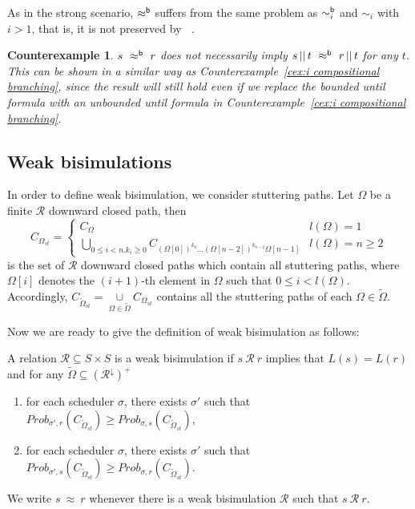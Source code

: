 \documentclass{LMCS}
\DeclareMathOperator{\interleave}{||}
\newtheorem{counter}{Counterexample}
\def\tilde{\widetilde}
\newcommand{\WBS}{\approx}
\newcommand{\iBS}[1]{\sim_{#1}}
\newcommand{\iBSB}[1]{\sim_{#1}^{{\sf b}}}
\newcommand{\MC}[1]{\mathcal{#1}}
\newcommand{\WBSB}{\approx^{{\sf b}}}
\newcommand{\MEASURE}{\mathit{Prob}}
\newcommand{\DOWNWARD}[2]{#1^{\downarrow}#2}
\begin{document}
As in the strong scenario, $\WBSB$ suffers from the same problem as $\iBSB{i}$ and $\iBS{i}$ with $i>1$, that is, it is not preserved by $\interleave$.
\begin{counter}\label{cex:weak bisimulation composition branching}
$s~\WBSB~r$ does not necessarily imply $s\interleave t~\WBSB~r\interleave t$ for any $t$.
This can be shown in a similar way as Counterexample~\ref{cex:i compositional branching},
since the result will still hold even if we replace the bounded until formula with an
unbounded until formula in Counterexample~\ref{cex:i compositional branching}.
\end{counter}

\subsection{Weak bisimulations}\label{sec:weak bisimulation}
In order to define weak bisimulation, we consider stuttering paths. Let $\Omega$ be a finite $\MC{R}$ downward closed path, then
\begin{equation}
C_{\Omega_{\mathit{st}}}=\begin{cases}C_{\Omega} & l(\Omega)=1\\ \mathop{\bigcup}\limits_{0\leq i<n.k_i\geq 0}C_{(\Omega[0])^{k_0}\ldots(\Omega[n-2])^{k_{n-2}}\Omega[n-1]} & l(\Omega)=n\geq 2\end{cases}
\end{equation}
is the set of $\MC{R}$ downward closed paths which contain all stuttering paths,
where $\Omega[i]$ denotes the $(i+1)$-th element in $\Omega$ such that $0\leq i<l(\Omega)$.
Accordingly, $C_{\tilde{\Omega}_{\mathit{st}}}=\mathop{\cup}\limits_{\Omega\in\tilde{\Omega}}C_{\Omega_{\mathit{st}}}$
contains all the stuttering paths of each $\Omega\in\tilde{\Omega}$.

Now we are ready to give the definition of weak bisimulation as follows:
\begin{defi}\label{def:weak bisimulation}
A relation $\MC{R}\subseteq S\times S$ is a
weak bisimulation if $s~\MC{R}~r$ implies that $L(s)=L(r)$ and for any $\tilde{\Omega}\subseteq (\DOWNWARD{\MC{R}}{})^+$
\begin{enumerate}[(1)]
\item for each scheduler $\sigma$, there exists $\sigma'$ such that  $\MEASURE_{\sigma',r}(C_{\tilde{\Omega}_{\mathit{st}}})\geq\MEASURE_{\sigma,s}(C_{\tilde{\Omega}_{\mathit{st}}})$,
\item for each scheduler $\sigma$, there exists $\sigma'$ such that $\MEASURE_{\sigma',s}(C_{\tilde{\Omega}_{\mathit{st}}})\geq\MEASURE_{\sigma,r}(C_{\tilde{\Omega}_{\mathit{st}}})$.
\end{enumerate}

\noindent We write $s~\WBS~r$ whenever there is a weak bisimulation $\MC{R}$ such that $s~\MC{R}~r$.
\end{defi}
\end{document}
